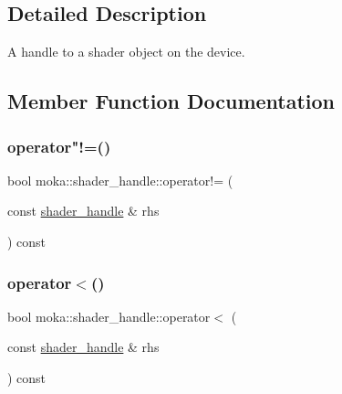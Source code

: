 \subsection{Detailed Description}
A handle to a shader object on the device. 

\subsection{Member Function Documentation}
\mbox{\label{structmoka_1_1shader__handle_a45ea92028769bc8bda10522f639c0d97}} 
\subsubsection{\texorpdfstring{operator"!=()}{operator!=()}}
{\footnotesize\ttfamily bool moka\+::shader\+\_\+handle\+::operator!= (\begin{DoxyParamCaption}\item[{const \mbox{\hyperlink{structmoka_1_1shader__handle}{shader\+\_\+handle}} \&}]{rhs }\end{DoxyParamCaption}) const\hspace{0.3cm}{\ttfamily [inline]}}

\mbox{\label{structmoka_1_1shader__handle_a1b4d9ec39e50ad14ae55b4b99ec36e53}} 
\subsubsection{\texorpdfstring{operator$<$()}{operator<()}}
{\footnotesize\ttfamily bool moka\+::shader\+\_\+handle\+::operator$<$ (\begin{DoxyParamCaption}\item[{const \mbox{\hyperlink{structmoka_1_1shader__handle}{shader\+\_\+handle}} \&}]{rhs }\end{DoxyParamCaption}) const\hspace{0.3cm}{\ttfamily [inline]}}

\mbox{\label{structmoka_1_1shader__handle_a63f2fc67f7d374ec06da5d6922b25894}} 
